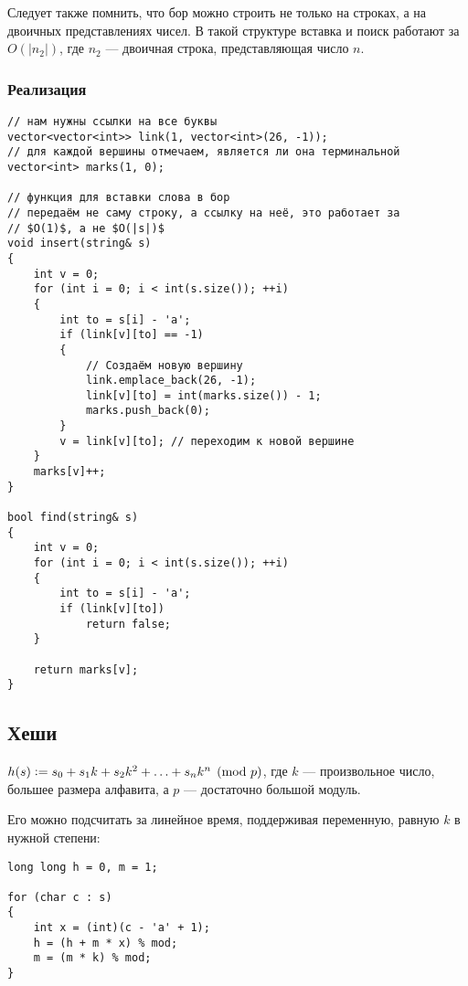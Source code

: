 Следует также помнить, что бор можно строить не только на строках, а на двоичных представлениях чисел. В такой структуре вставка и поиск работают за $O(|n_2|)$, где $n_2$ --- двоичная строка, представляющая число $n$.

\subsubsection{Реализация}

\begin{verbatim}
// нам нужны ссылки на все буквы
vector<vector<int>> link(1, vector<int>(26, -1));
// для каждой вершины отмечаем, является ли она терминальной
vector<int> marks(1, 0);

// функция для вставки слова в бор
// передаём не саму строку, а ссылку на неё, это работает за 
// $O(1)$, а не $O(|s|)$
void insert(string& s)
{
    int v = 0;
    for (int i = 0; i < int(s.size()); ++i)
    {
        int to = s[i] - 'a';
        if (link[v][to] == -1)
        {
            // Создаём новую вершину
            link.emplace_back(26, -1);
            link[v][to] = int(marks.size()) - 1;
            marks.push_back(0);
        }
        v = link[v][to]; // переходим к новой вершине
    }
    marks[v]++;
}

bool find(string& s)
{
    int v = 0;
    for (int i = 0; i < int(s.size()); ++i)
    {
        int to = s[i] - 'a';
        if (link[v][to])
            return false;
    }

    return marks[v];
}
\end{verbatim}

\subsection{Хеши}

\begin{definition}
    $h(s) \vcentcolon = s_0 + s_1k + s_2k^2 \hm + \ldots + s_nk^n \pmod p$, где $k$ --- произвольное число, большее размера алфавита, а $p$ --- достаточно большой модуль.
\end{definition}

Его можно подсчитать за линейное время, поддерживая переменную, равную $k$ в нужной степени:

\begin{verbatim}
long long h = 0, m = 1;

for (char c : s)
{
    int x = (int)(c - 'a' + 1);
    h = (h + m * x) % mod;
    m = (m * k) % mod;
}
\end{verbatim}

